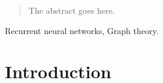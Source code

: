\documentclass[journal]{IEEEtran}
\begin{document}







\maketitle

\begin{abstract}
The abstract goes here.
\end{abstract}

\begin{IEEEkeywords}
Recurrent neural networks, Graph theory.
\end{IEEEkeywords}






%
\IEEEpeerreviewmaketitle



\section{Introduction}
% 
% 
% 
% 
\end{document}
